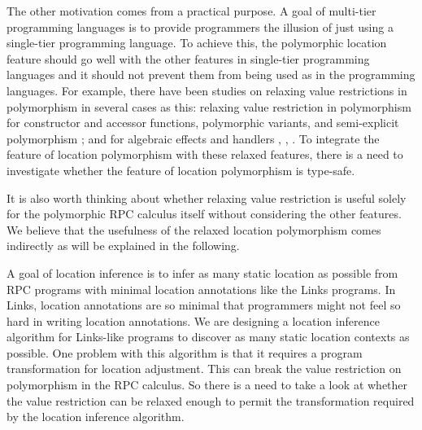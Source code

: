\documentclass[a4paper]{article}
\theoremstyle{plain}
\theoremstyle{definition}
\begin{document}
%
The other motivation comes from a practical purpose.
%
A goal of multi-tier programming languages is to provide programmers
the illusion of just using a single-tier programming language.
%
To achieve this, the polymorphic location feature should go well with
the other features in single-tier programming languages and it should
not prevent them from being used as in the programming languages.
%
For example, there have been studies on relaxing value restrictions in
polymorphism in several cases as this: relaxing value restriction in
polymorphism for constructor and accessor functions, polymorphic
variants, and semi-explicit polymorphism
\cite{10.1007/978-3-540-24754-8_15}; and for algebraic effects and
handlers \cite{kammar_pretnar_2017},
\cite{10.1007/978-3-030-17184-1_13}, \cite{10.1145/3408999}.
%  
To integrate the feature of location polymorphism with these relaxed
features, there is a need to investigate whether the feature of
location polymorphism is type-safe.
%

It is also worth thinking about whether relaxing value restriction is
useful solely for the polymorphic RPC calculus itself without
considering the other features.
%
We believe that the usefulness of the relaxed location polymorphism
comes indirectly as will be explained in the following.

%
A goal of location inference is to infer as many static location as
possible from RPC programs with minimal location annotations like the
Links programs.
%
In Links, location annotations are so minimal that programmers might
not feel so hard in writing location annotations.
%
We are designing a location inference algorithm for Links-like
programs to discover as many static location contexts as possible.
%
One problem with this algorithm is that it requires a program
transformation for location adjustment.
%
This can break the value restriction on polymorphism in the RPC
calculus.
%
So there is a need to take a look at whether the value restriction can
be relaxed enough to permit the transformation required by the
location inference algorithm.

\end{document}
